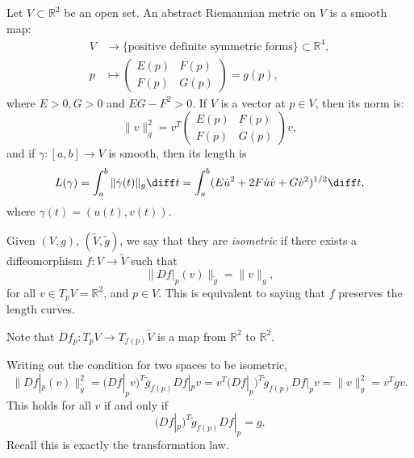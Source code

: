\documentclass[12pt]{article}
\begin{document}
\begin{definition}
	Let $V \subset \mathbb{R}^2$ be an open set. An abstract Riemannian metric on $V$ is a smooth map:
	\begin{align*}
		V &\to \{\text{positive definite symmetric forms}\} \subset \mathbb{R}^{4}, \\
		p &\mapsto 
		\begin{pmatrix}
			E(p) & F(p) \\ F(p) & G(p)
		\end{pmatrix}
		= g(p),
	\end{align*}
	where $E > 0, G > 0$ and $EG - F^2 > 0$. If $V$ is a vector at $p \in V$, then its norm is:
	\[
	\|v\|^2_{g} = v^{T}
	\begin{pmatrix}
		E(p) & F(p) \\ F(p) & G(p)
	\end{pmatrix}
	v,
	\]
	and if $\gamma : [a, b] \to V$ is smooth, then its length is
	\[
	L(\gamma) = \int_{a}^{b} \|\dot \gamma(t)\|_{g} \diff t = \int_{a}^{b}(E \dot u^2 + 2 F \dot u \dot v + G \dot v^2)^{1/2} \diff t,
	\]
	where $\gamma(t) = (u(t), v(t))$.
\end{definition}

\begin{definition}
	Given $(V, g)$, $(\tilde V, \tilde g)$, we say that they are \emph{isometric} if there exists a diffeomorphism $f : V \to \tilde V$ such that
	\[
	\|Df|_p(v)\|_{\tilde g} = \|v\|_{g},
	\]
	for all $v \in T_pV = \mathbb{R}^2$, and $p \in V$. This is equivalent to saying that $f$ preserves the length curves.
\end{definition}

Note that $Df_p : T_p V \to T_{f(p)}\tilde V$ is a map from $\mathbb{R}^2$ to $\mathbb{R}^2$.

Writing out the condition for two spaces to be isometric,
\[
\|Df|_p(v)\|^2_{\tilde g} = (Df|_p v)^{T} \tilde g_{f(p)}Df|_p v = v^{T}(Df|_p)^{T} \tilde g_{f(p)} Df|_p v = \|v\|_g^2 = v^{T}g v.
\]
This holds for all $v$ if and only if
\[
	(Df|_p)^{T} \tilde g_{f(p)} Df|_p = g.
\]
Recall this is exactly the transformation law.
\end{document}
